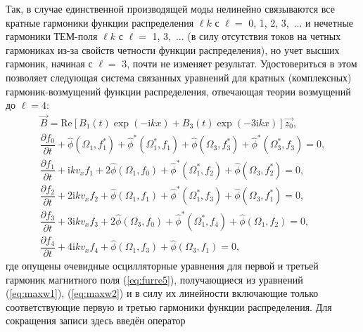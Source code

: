 Так, в случае единственной производящей моды нелинейно связываются все кратные гармоники функции распределения $\ell k$ с $\ell =$ 0, 1, 2, 3,~... и нечетные гармоники ТЕМ-поля $\ell k$ с $\ell =$ 1, 3,~... (в силу отсутствия токов на четных гармониках из-за свойств четности функции распределения), но учет высших гармоник, начиная с $\ell =$ 3, почти не изменяет результат.  Удостовериться в этом позволяет следующая система связанных уравнений для кратных (комплексных) гармоник-возмущений функции распределения, отвечающая теории возмущений до $\ell = 4$:
\begin{align}
    \label{eq:furre5}
    \vec{B} = \mathrm{Re} \left[ B_1(t) \exp(-\mathrm{i}kx)+B_3(t)\exp(-3\mathrm{i}kx)\right] \vec{z_0} ,\\
\label{eq:f0.1}\dfrac{\partial f_0}{\partial t}+\hat \phi(\Omega_1,f_1^*)+\hat \phi^*(\Omega_1^*,f_1)+\hat \phi(\Omega_3,f_3^*)+\hat \phi^*(\Omega_3^*,f_3)=0,\\
\label{eq:f1.1}\dfrac{\partial f_1}{\partial t}+\mathrm{i}kv_xf_1+2\hat \phi(\Omega_1,f_0)+\hat \phi^*(\Omega_1^*,f_2)+\hat \phi(\Omega_3,f_2^*)=0,\\
\label{eq:f2.1}\dfrac{\partial f_2}{\partial t}+2\mathrm{i}kv_xf_2+\hat \phi(\Omega_1,f_1)+\hat \phi^*(\Omega_1^*,f_3)+\hat \phi(\Omega_3,f_1^*)=0,\\
\label{eq:f3.1}\dfrac{\partial f_3}{\partial t}+3\mathrm{i}kv_xf_3+2\hat \phi(\Omega_3,f_0)+\hat \phi^*(\Omega_1^*,f_4)+\hat \phi(\Omega_1,f_2)=0,\\
\label{eq:f4.1}
\dfrac{\partial f_4}{\partial t}+4\mathrm{i}kv_xf_4+\hat \phi(\Omega_1,f_3)+\hat \phi(\Omega_3,f_1)=0,
\end{align}
где опущены очевидные осцилляторные уравнения для первой и третьей гармоник магнитного поля (\ref{eq:furre5}), получающиеся из уравнений (\ref{eq:maxw1}), (\ref{eq:maxw2}) и в силу их линейности включающие только соответствующие первую и третью гармоники функции распределения. Для сокращения записи здесь введён оператор
